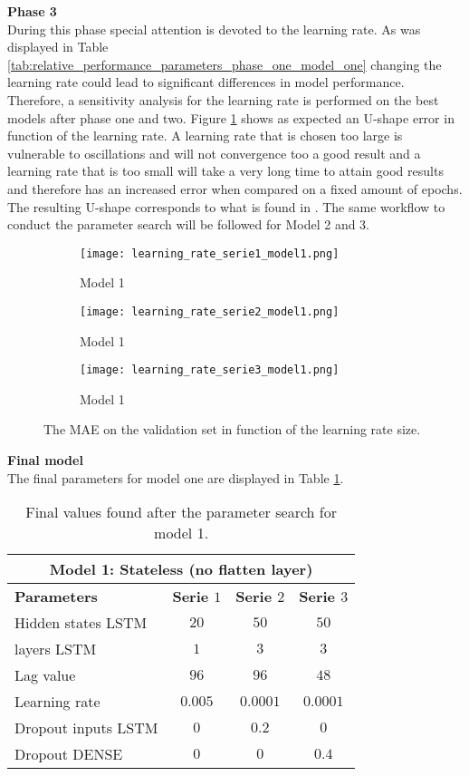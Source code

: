 \textbf{Phase 3}\\
During this phase special attention is devoted to the learning rate. As was displayed in Table \ref{tab:relative_performance_parameters_phase_one_model_one} changing the learning rate could lead to significant differences in model performance. Therefore, a sensitivity analysis for the learning rate is performed on the best models after phase one and two. Figure \ref{fig:learning_rate_model1} shows as expected an U-shape error in function of the learning rate. A learning rate that is chosen too large is vulnerable to oscillations and will not convergence too a good result and a learning rate that is too small will take a very long time to attain good results and therefore has an increased error when compared on a fixed amount of epochs. The resulting U-shape corresponds to what is found in \cite{Greff2017}. The same workflow to conduct the parameter search will be followed for Model 2 and 3.\\

\begin{figure}[h!]
	\centering
	\begin{subfigure}{0.49\linewidth}
		\texttt{[image: learning\_rate\_serie1\_model1.png]}
		\caption{Model 1}
	\end{subfigure}	
	\begin{subfigure}{0.49\linewidth}
		\texttt{[image: learning\_rate\_serie2\_model1.png]}
		\caption{Model 1}
	\end{subfigure}
	\begin{subfigure}{0.5\linewidth}
		\texttt{[image: learning\_rate\_serie3\_model1.png]}
		\caption{Model 1}
	\end{subfigure}
	\caption{The MAE on the validation set in function of the learning rate size.}
	\label{fig:learning_rate_model1}
\end{figure}


\textbf{Final model}\\
The final parameters for model one are displayed in Table \ref{tab:final_model1}.

\begin{table}[h!]
	\centering
	\begin{tabular}{@{}l|ccc@{}} \toprule
		\multicolumn{4}{c}{Model 1: Stateless (no flatten layer)}\\\midrule\midrule
		\textbf{Parameters}	& \textbf{Serie $ 1 $} & \textbf{Serie $ 2 $} & \textbf{Serie $ 3 $}\\\midrule
		Hidden states LSTM & $20 $&$ 50 $  & $50 $\\
		layers LSTM & $1 $&$ 3 $  & $3$\\
		Lag value & $96 $&$ 96$  & $48$\\
		Learning rate & $0.005 $&$ 0.0001$  & $0.0001$\\\hline
		Dropout inputs LSTM   & $ 0 $ & $ 0.2 $ & $ 0 $\\
		Dropout DENSE   & $ 0 $ & $ 0 $ & $ 0.4 $\\\bottomrule
	\end{tabular}
	\caption{Final values found after the parameter search for model 1.}
	\label{tab:final_model1}
\end{table}


